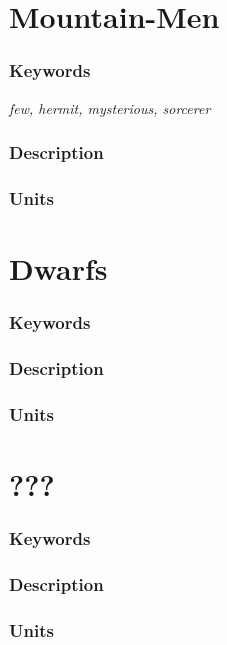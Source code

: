 \documentclass[a5paper,pagesize,10pt,bibtotoc,pointlessnumbers,
normalheadings,DIV=9,twoside=false]{scrbook}
\begin{document}
\newpage
\section{Mountain-Men}

\subsubsection{Keywords}
\emph{few, hermit, mysterious, sorcerer}

\subsubsection{Description}


\subsubsection{Units}

\newpage
\section{Dwarfs}

\subsubsection{Keywords}
\emph{}

\subsubsection{Description}


\subsubsection{Units}

\newpage
\section{???}

\subsubsection{Keywords}
\emph{}

\subsubsection{Description}


\subsubsection{Units}
\end{document}
